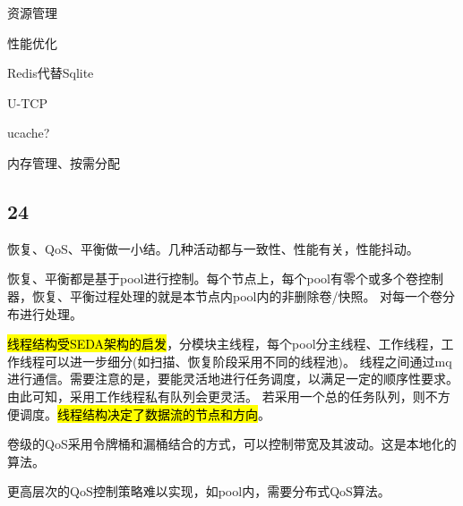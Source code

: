 资源管理

性能优化
\begin{enumbox}
\item Redis代替Sqlite
\item U-TCP
\item ucache?
\item 内存管理、按需分配
\end{enumbox}

\subsection{24}

恢复、QoS、平衡做一小结。几种活动都与一致性、性能有关，性能抖动。

恢复、平衡都是基于pool进行控制。每个节点上，每个pool有零个或多个卷控制器，恢复、平衡过程处理的就是本节点内pool内的非删除卷/快照。
对每一个卷分布进行处理。

\hl{线程结构受SEDA架构的启发}，分模块主线程，每个pool分主线程、工作线程，工作线程可以进一步细分(如扫描、恢复阶段采用不同的线程池)。
线程之间通过mq进行通信。需要注意的是，要能灵活地进行任务调度，以满足一定的顺序性要求。由此可知，采用工作线程私有队列会更灵活。
若采用一个总的任务队列，则不方便调度。\hl{线程结构决定了数据流的节点和方向}。

卷级的QoS采用令牌桶和漏桶结合的方式，可以控制带宽及其波动。这是本地化的算法。

更高层次的QoS控制策略难以实现，如pool内，需要分布式QoS算法。
